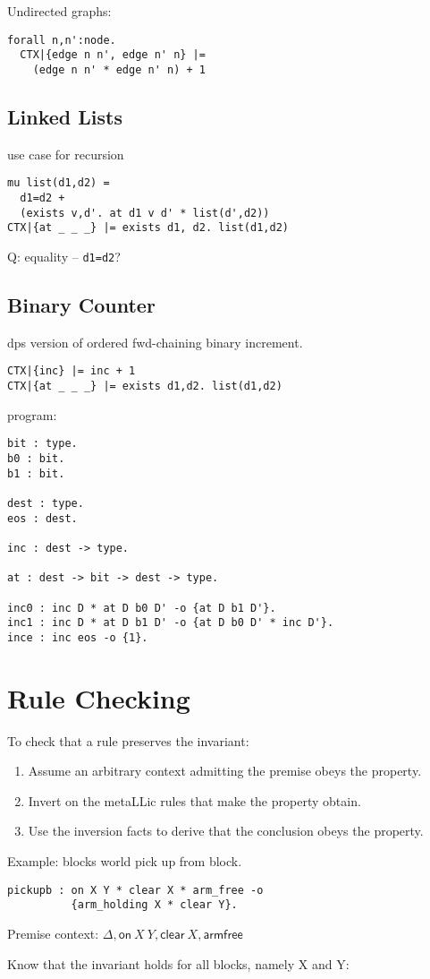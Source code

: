 \documentclass[fullpage, 11pt]{article}
\begin{document}
Undirected graphs:
\begin{verbatim}
forall n,n':node.
  CTX|{edge n n', edge n' n} |=
    (edge n n' * edge n' n) + 1
\end{verbatim}

\subsection*{Linked Lists}
use case for recursion

\begin{verbatim}
mu list(d1,d2) =
  d1=d2 +
  (exists v,d'. at d1 v d' * list(d',d2))
CTX|{at _ _ _} |= exists d1, d2. list(d1,d2)
\end{verbatim}
Q: equality -- \verb|d1=d2|?

\subsection*{Binary Counter}
dps version of ordered fwd-chaining binary increment.
\begin{verbatim}
CTX|{inc} |= inc + 1
CTX|{at _ _ _} |= exists d1,d2. list(d1,d2)
\end{verbatim}

program:
\begin{verbatim}
bit : type.
b0 : bit.
b1 : bit.

dest : type.
eos : dest.

inc : dest -> type.

at : dest -> bit -> dest -> type.

inc0 : inc D * at D b0 D' -o {at D b1 D'}.
inc1 : inc D * at D b1 D' -o {at D b0 D' * inc D'}.
ince : inc eos -o {1}.
\end{verbatim}

\section{Rule Checking}

To check that a rule preserves the invariant:

\begin{enumerate}
\item Assume an arbitrary context admitting the premise obeys the property.
\item Invert on the metaLLic rules that make the property obtain. 
\item Use the inversion facts to derive that the conclusion obeys the
property.
\end{enumerate}

Example: blocks world pick up from block.

\begin{verbatim}
pickupb : on X Y * clear X * arm_free -o
          {arm_holding X * clear Y}.
\end{verbatim}

Premise context:
$\Delta, \mathsf{on\ }X\ Y, \mathsf{clear\ }X, \mathsf{armfree}$

Know that the invariant holds for all blocks, namely X and Y:






\end{document}
